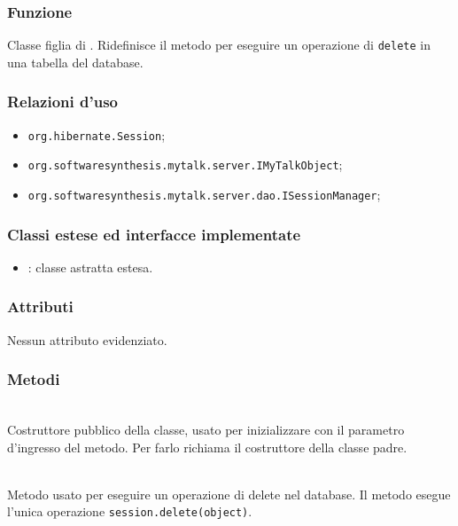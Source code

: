 \subsubsection*{Funzione}
Classe figlia di . Ridefinisce il metodo  per eseguire un operazione di \texttt{delete} in una tabella del database.

\subsubsection*{Relazioni d'uso}

\begin{itemize}
		\item \texttt{org.hibernate.Session};
		\item \texttt{org.softwaresynthesis.mytalk.server.IMyTalkObject};
		\item \texttt{org.softwaresynthesis.mytalk.server.dao.ISessionManager};
\end{itemize}

\subsubsection*{Classi estese ed interfacce implementate}

\begin{itemize}
	\item {}: classe astratta estesa.
\end{itemize}

\subsubsection*{Attributi}

Nessun attributo evidenziato.

\subsubsection*{Metodi}

\begin{description}
	\item{}\\
	Costruttore pubblico della classe, usato per inizializzare  con il parametro d'ingresso del metodo. Per farlo richiama il costruttore della classe padre.

	\item{}\\
	Metodo usato per eseguire un operazione di delete nel database. Il metodo esegue l'unica operazione \verb|session.delete(object)|.

\end{description}

